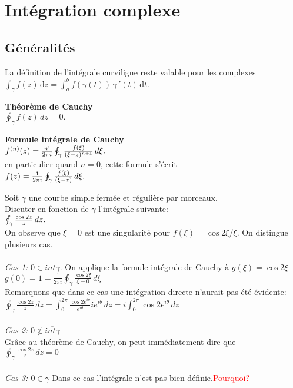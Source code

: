\chapter[Intégration complexe]{Intégration complexe}

\section{Généralités}
\begin{myDefinition} 
	La définition de l'intégrale curviligne reste valable pour les complexes
	\\
	$\int_\gamma f(z)\,\mathrm{d}z = \int_a^b f(\gamma(t))\,\gamma\,'(t)\,\mathrm{d}t.$
\end{myDefinition}

\begin{myTheorem}
	{\bf Théorème de Cauchy}
	\\
	$\oint_\gamma f(z)\,dz = 0. $
\end{myTheorem}
\begin{myTheorem}
	{\bf Formule intégrale de Cauchy}
	\\
	$f^{(n)}(z) = {n! \over 2\pi i} \oint_\gamma {f(\xi) \over (\xi-z)^{n+1}}\, d\xi.$
	\\en particulier quand $n=0$, cette formule s'écrit
	\\
	$f(z) = {1 \over 2\pi i} \oint_\gamma {f(\xi) \over (\xi-z)}\, d\xi.$

\end{myTheorem}
\begin{myExample}
	Soit $\gamma$ une courbe simple fermée et régulière par morceaux.
	\\Discuter en fonction de $\gamma$ l'intégrale suivante:\\
	$\oint_\gamma {\cos 2z \over z}\, dz.$
	\\
	On observe que $\xi=0$ est une singularité pour $f(\xi)=\cos 2\xi /\xi$. On distingue plusieurs cas.
	\\
	\\
	{\it Cas 1:} $0 \in int \gamma$. On applique la formule intégrale de Cauchy à $g(\xi)=\cos 2\xi $
	\\
	$g(0)=1=\frac{1}{2\pi i}\oint_\gamma \frac{\cos 2\xi}{\xi -0}\, d\xi$
	\\
	Remarquons que dans ce cas une intégration directe n'aurait pas été évidente:
	\\
	$\oint_\gamma \frac{\cos 2z}{z}\,dz=\int_{0}^{2\pi} \frac{\cos 2e^{i\theta}}{e^{i\theta}}ie^{i\theta}\,dz=i\int_{0}^{2\pi} \cos 2e^{i\theta}\,dz$
	\\
	\\
	{\it Cas 2:} $0\notin \overline{int \gamma}$ 
	\\
	Grâce au théorème de Cauchy, on peut immédiatement dire que 
	\\
	$\oint_\gamma \frac{\cos 2z}{z}\,dz=0$
	\\
	\\
	{\it Cas 3: $0 \in \gamma$} Dans ce cas l'intégrale n'est pas bien définie.\textcolor{red}{Pourquoi?}
\end{myExample}

